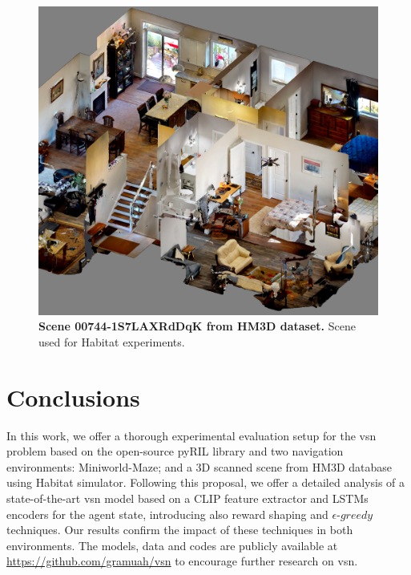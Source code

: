 \begin{figure}
    \centering
    \includegraphics[width=0.6\linewidth]{figures/understanding_vsn/dollhouse}
    \caption{\textbf{Scene 00744-1S7LAXRdDqK from HM3D dataset.} Scene used for Habitat experiments.}
    \label{fig:dollhouse}
\end{figure}

\section{Conclusions}
\label{sec:conclusions}

In this work, we offer a thorough experimental evaluation setup for the \acrshort{vsn} problem based on the open-source pyRIL library and two navigation environments: Miniworld-Maze; and a 3D scanned scene from HM3D database using Habitat simulator.
Following this proposal, we offer a detailed analysis of a state-of-the-art \acrshort{vsn} model based on a CLIP feature extractor and LSTMs encoders for the agent state, introducing also reward shaping and $\epsilon\text{-}greedy$ techniques.
Our results confirm the impact of these techniques in both environments.
The models, data and codes are publicly available at \url{https://github.com/gramuah/vsn} to encourage further research on \acrshort{vsn}\@.

